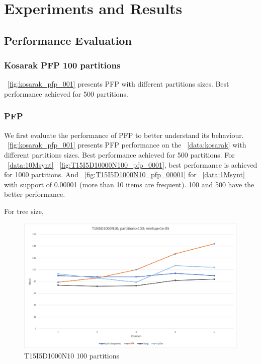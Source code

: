\section{Experiments and Results}

\subsection{Performance Evaluation}
\subsubsection{Kosarak PFP 100 partitions}
~\autoref{fig:kosarak_pfp_001} presents PFP with different partitions sizes. Best performance achieved for 500 partitions.

\subsubsection{PFP}
We first evaluate the performance of PFP to better understand its behaviour. ~\autoref{fig:kosarak_pfp_001} presents PFP performance on the ~\autoref{data:kosarak} with different partitions sizes. Best performance achieved for 500 partitions. For ~\autoref{data:10Msynt} ~\autoref{fig:T15I5D10000N100_pfp_0001}, best performance is achieved for 1000 partitions. And ~\autoref{fig:T15I5D1000N10_pfp_00001} for ~\autoref{data:1Msynt} with support of 0.00001 (more than 10 items are frequent). 100 and 500 have the better performance.

For tree size, 

\begin{figure}
  \centering
  \includegraphics[width=\linewidth]{figures/4iterations/T15I5D1000N10_100_0005}
  \caption{T15I5D1000N10 100 partitions}
  \label{fig:T15I5D1000N10_100_0005}
\end{figure}

